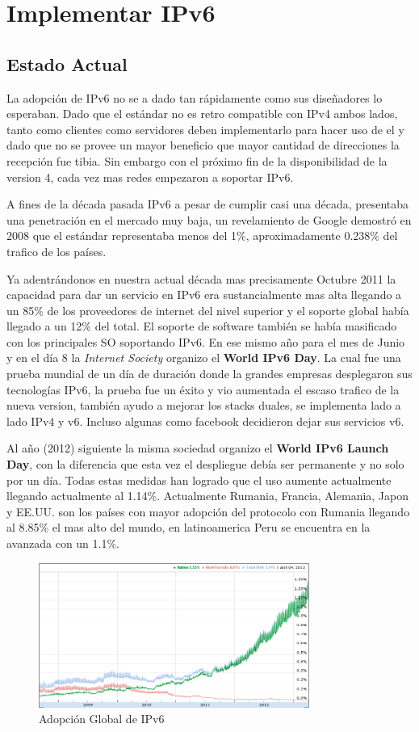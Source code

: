 \documentclass[11pt,a4paper]{article}
\begin{document}
\section{Implementar IPv6}
\subsection{Estado Actual}
La adopción de IPv6 no se a dado tan rápidamente como sus diseñadores lo esperaban. Dado que el 
estándar no es retro compatible con IPv4 ambos lados, tanto como clientes como servidores deben 
implementarlo para hacer uso de el y dado que no se provee un mayor beneficio que mayor cantidad de 
direcciones la recepción fue tibia. Sin embargo con el próximo fin de la disponibilidad de la 
version 4, cada vez mas redes empezaron a soportar IPv6.\par
A fines de la década pasada IPv6 a pesar de cumplir casi una década, presentaba una penetración en 
el mercado muy baja, un revelamiento de Google demostró en 2008 que el estándar representaba menos
del 1\%, aproximadamente 0.238\% del trafico de los países\cite{googleIPv6}.\par
Ya adentrándonos en nuestra actual década mas precisamente Octubre 2011 la capacidad para dar un 
servicio en IPv6 era sustancialmente mas alta llegando a un 85\% de los proveedores de internet del 
nivel superior y el soporte global había llegado a un 12\% del total. El soporte de software también 
se había masificado con los principales SO soportando IPv6. En ese 
mismo año para el mes de Junio y en el día 8 la \emph{Internet Society} organizo el \textbf{World 
IPv6 Day}. La cual fue una prueba mundial de un día de duración donde la grandes empresas 
desplegaron sus tecnologías IPv6, la prueba fue un éxito y vio aumentada el escaso trafico de la 
nueva version, también ayudo a mejorar los stacks duales, se implementa lado a lado IPv4 y v6. 
Incluso algunas como facebook decidieron dejar sus servicios v6.\par
Al año (2012) siguiente la misma sociedad organizo el \textbf{World IPv6 Launch Day}, con la 
diferencia que esta vez el despliegue debía ser permanente y no solo por un día. Todas estas medidas 
han logrado que el uso aumente actualmente llegando actualmente al 1.14\%. Actualmente Rumania, 
Francia, Alemania, Japon y EE.UU. son los países con mayor adopción del protocolo con Rumania 
llegando al 8.85\% el mas alto del mundo, en latinoamerica Peru se encuentra en la avanzada con un 
1.1\%.
\begin{figure}[h!]
 \centering
 \includegraphics[width=0.79\textwidth]{adopcionIPv6.png}
 \caption[Adopción Global de IPv6]{Adopción Global de IPv6}
\end{figure}
\end{document}
